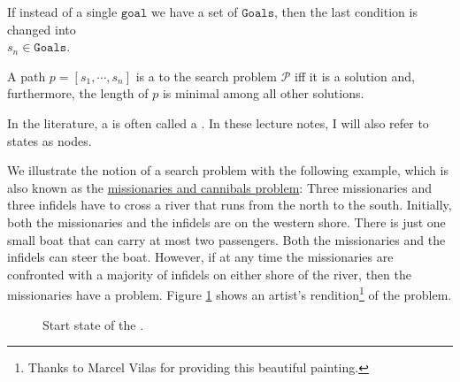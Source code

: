 \begin{Definition}
\begin{enumerate}
        If instead of a single $\texttt{goal}$ we have a set of $\texttt{Goals}$, then the last condition
        is changed into
        \\[0.2cm]
        \hspace*{1.3cm}
        $s_n \in \mathtt{Goals}$.
  \end{enumerate}
  A path $p = [s_1, \cdots, s_n]$ is a  to the search problem $\mathcal{P}$
  iff it is a solution and, furthermore, the length of $p$ is minimal among all other solutions. \eoxs
\end{Definition}

\remark
In the literature, a  is often called a .  
In these lecture notes, I will also refer to states as nodes.  \eoxs

\example
We illustrate the notion of a search problem with the following example, which is also known as the
\href{https://en.wikipedia.org/wiki/Missionaries_and_cannibals_problem}{missionaries and cannibals problem}:
Three missionaries and three infidels have to cross a river that runs from the north to the south.
Initially, both the missionaries and the infidels are on the western shore.  There is just one small boat 
that can carry at most two passengers.  Both the missionaries and the infidels can steer the boat.
However, if at any time the missionaries are confronted with a majority of infidels on either shore of the
river, then the missionaries have a problem.  Figure \ref{fig:missionaries-and-infidels.pdf} shows an 
artist's rendition\footnote{Thanks to Marcel Vilas for providing this beautiful painting.}
of the problem.

\begin{figure}[!ht]
  \centering
  \caption{Start state of the .}
  \label{fig:missionaries-and-infidels.pdf}
\end{figure}


